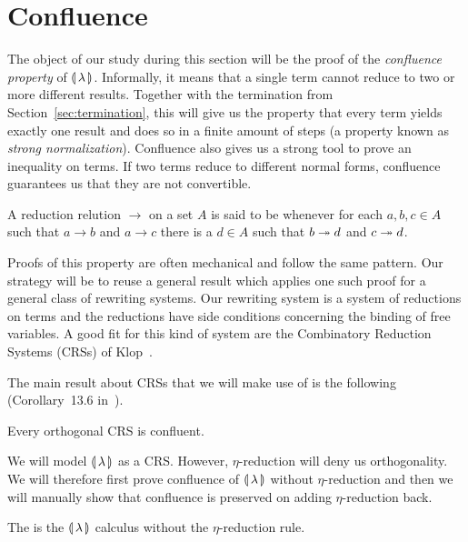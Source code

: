 \section{Confluence}
\label{sec:confluence}

The object of our study during this section will be the proof of the
\emph{confluence property} of $\llparenthesis \, \lambda \, \rrparenthesis$. Informally, it means that
a single term cannot reduce to two or more different results. Together with
the termination from Section~\ref{sec:termination}, this will give us the
property that every term yields exactly one result and does so in a finite
amount of steps (a property known as \emph{strong
  normalization}). Confluence also gives us a strong tool to prove an
inequality on terms. If two terms reduce to different normal forms,
confluence guarantees us that they are not convertible.

\begin{definition}
  A reduction relution $\to$ on a set $A$ is said to be 
  whenever for each $a,b,c \in A$ such that $a \to b$ and $a \to c$ there
  is a $d \in A$ such that $b \twoheadrightarrow d$ and $c \twoheadrightarrow d$.
\end{definition}

Proofs of this property are often mechanical and follow the same
pattern. Our strategy will be to reuse a general result which applies one
such proof for a general class of rewriting systems. Our rewriting system
is a system of reductions on terms and the reductions have side conditions
concerning the binding of free variables. A good fit for this kind of
system are the Combinatory Reduction Systems (CRSs) of
Klop~\cite{klop1993combinatory}.

The main result about CRSs that we will make use of is the following
(Corollary~13.6 in~\cite{klop1993combinatory}).

\begin{theorem}\label{thm:confluence-crs}

  Every orthogonal CRS is confluent.
\end{theorem}

We will model ${\llparenthesis \, \lambda \, \rrparenthesis}$ as a CRS. However, $\eta$-reduction will deny us
orthogonality. We will therefore first prove confluence of ${\llparenthesis \, \lambda \, \rrparenthesis}$ without
$\eta$-reduction and then we will manually show that confluence is
preserved on adding $\eta$-reduction back.

\begin{notation}
  The  is the
  $\llparenthesis \, \lambda \, \rrparenthesis$ calculus without the $\eta$-reduction rule.
\end{notation}

